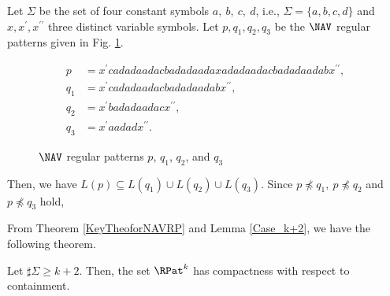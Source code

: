 \begin{ex}\label{Case_k+1}\label{反例k+1}
Let $\Sigma$ be the set of four constant symbols $a,~b,~c,~d$, i.e., $\Sigma= \{a, b, c, d \}$ and $x,x^{\prime},x^{\prime\prime}$ three distinct variable symbols.
Let $p,q_{1},q_{2},q_{3}$ be the $\NAV$ regular patterns given in Fig. \ref{Fig:CounterExampleforNAVR}. 
\begin{figure*}[tb]
\begin{align*}
p & = x^{\prime}cadadaadacbadadaadaxadadaadacbadadaadabx^{\prime\prime},\\
q_{1} & = x^{\prime}cadadaadacbadadaadabx^{\prime\prime},\\
q_{2} & = x^{\prime}badadaadacx^{\prime\prime},\\
q_{3} & = x^{\prime}aadadx^{\prime\prime}.
\end{align*}
\caption{$\NAV$ regular patterns $p$, $q_{1}$, $q_{2}$, and $q_{3}$}\label{Fig:CounterExampleforNAVR}
\end{figure*}
\noindent
Then, we have $L(p) \subseteq L(q_{1}) \cup L(q_{2}) \cup L(q_{3})$.
Since $p \not \preceq q_{1},~p \not \preceq q_{2}$ and $p \not \preceq q_{3}$ hold,


\end{ex}

From Theorem \ref{KeyTheoforNAVRP} and Lemma \ref{Case_k+2}, we have the following theorem.

\begin{thm}\label{MainTheforNAVRP}
Let $\sharp\Sigma \ge k+2$.
Then, the set $\RPat^{k}$ has compactness with respect to containment.
\end{thm}
